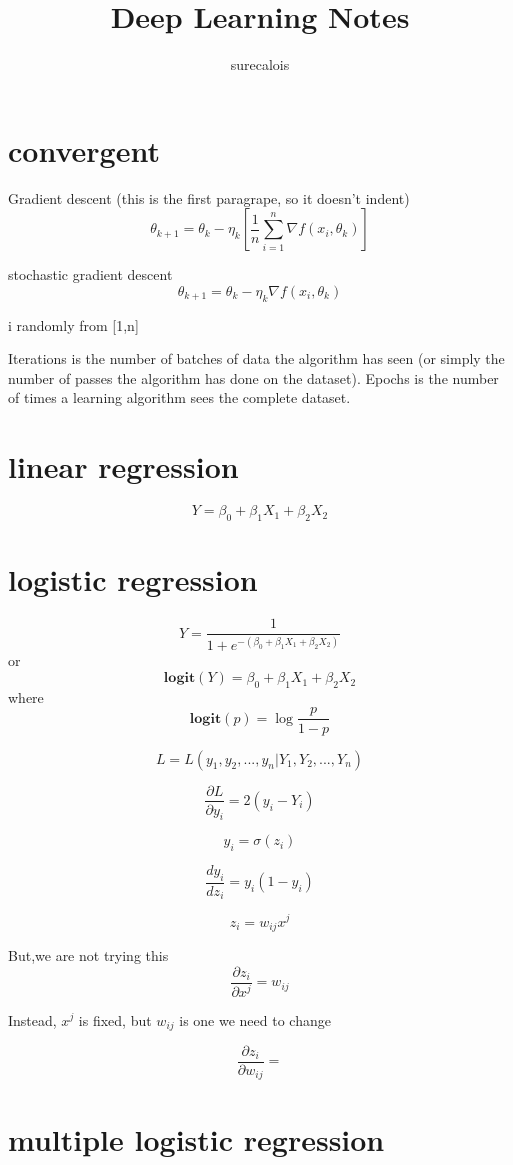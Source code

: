 \documentclass[12pt,a4paper]{article}
\title{Deep Learning Notes}
\author{surecalois}
\begin{document}
\maketitle

\section{convergent}
Gradient descent (this is the first paragrape, so it doesn't indent)
\[
\theta_{k+1}= \theta_k - \eta_k [\frac{1}{n}\sum_{i=1}^{n} \nabla f(x_i,\theta_k)]
\]

stochastic gradient descent
\[
\theta_{k+1}= \theta_k - \eta_k \nabla f(x_i,\theta_k)
\]


i randomly from [1,n]


Iterations is the number of batches of data the algorithm has seen (or simply the number of passes the algorithm has done on the dataset). Epochs is the number of times a learning algorithm sees the complete dataset.

\section{linear regression}
\[
	Y = \beta_0+\beta_1X_1 + \beta_2X_2
\]


\section{logistic regression}
\[
	Y = \frac{1}{1+e^{-(\beta_0+\beta_1X_1 + \beta_2X_2)}}
\]
or
\[
\mathbf{logit}(Y) = \beta_0+\beta_1X_1 + \beta_2X_2
\]
where
\[
	\mathbf{logit}(p) = \log\frac{p}{1-p}
\]

\[
	L = L(y_1, y_2, ..., y_n|Y_1,Y_2,...,Y_n)
\]

\[
	\frac{\partial L}{\partial y_i} = 2(y_i - Y_i)
\]

\[
	y_i = \sigma(z_i)
\]

\[
	\frac{dy_i}{dz_i} = y_i(1-y_i)
\]

\[
	z_i = w_{ij}x^j
\]

But,we are not trying this
\[
	\frac{\partial z_i}{\partial x^j} = w_{ij}
\]

Instead, $x^j$ is fixed, but $w_{ij}$ is one we need to change

\[
	\frac{\partial z_i}{\partial w_{ij}} = 
\]
\section{multiple logistic regression}
\end{document}
